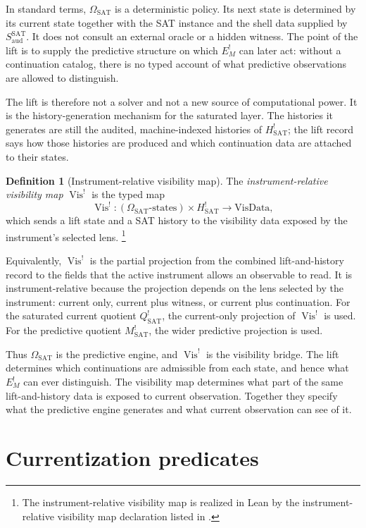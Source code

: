 \documentclass[11pt]{article}
\newcommand{\Saud}{S_{\mathrm{aud}}^{\mathrm{SAT}}}
\newcommand{\Hsat}{H^{!}_{\mathrm{SAT}}}
\newcommand{\EMbang}{E^{!}_{M}}
\newcommand{\Qsat}{Q^{!}_{\mathrm{SAT}}}
\newcommand{\Msat}{M^{!}_{\mathrm{SAT}}}
\newcommand{\OmegaSAT}{\Omega_{\mathrm{SAT}}}
\newcommand{\VisBang}{\operatorname{Vis}^{!}}
\theoremstyle{definition}
\newtheorem{definition}[theorem]{Definition}
\begin{document}
In standard terms, \(\OmegaSAT\) is a deterministic policy.  Its next
state is determined by its current state together with the SAT
instance and the shell data supplied by \(\Saud\).  It does not
consult an external oracle or a hidden witness.  The point of the lift
is to supply the predictive structure on which \(\EMbang\) can later
act: without a continuation catalog, there is no typed account of what
predictive observations are allowed to distinguish.

The lift is therefore not a solver and not a new source of
computational power.  It is the history-generation mechanism for the
saturated layer.  The histories it generates are still the audited,
machine-indexed histories of \(\Hsat\); the lift record says how those
histories are produced and which continuation data are attached to
their states.

\begin{definition}[Instrument-relative visibility map]
\label{def:pvnp:vis-bang}
The \emph{instrument-relative visibility map} \(\VisBang\) is the
typed map
\[
  \VisBang:
  (\OmegaSAT\text{-states})\times\Hsat
  \longrightarrow \mathrm{VisData},
\]
which sends a lift state and a SAT history to the visibility data
exposed by the instrument's selected lens.
\footnote{The instrument-relative visibility map is realized in Lean by
the instrument-relative visibility map declaration listed in
.}
\end{definition}

Equivalently, \(\VisBang\) is the partial projection from the combined
lift-and-history record to the fields that the active instrument
allows an observable to read.  It is instrument-relative because the
projection depends on the lens selected by the instrument: current
only, current plus witness, or current plus continuation.  For the
saturated current quotient \(\Qsat\), the current-only projection of
\(\VisBang\) is used.  For the predictive quotient \(\Msat\), the
wider predictive projection is used.

Thus \(\OmegaSAT\) is the predictive engine, and \(\VisBang\) is the
visibility bridge.  The lift determines which continuations are
admissible from each state, and hence what \(\EMbang\) can ever
distinguish.  The visibility map determines what part of the same
lift-and-history data is exposed to current observation.  Together
they specify what the predictive engine generates and what current
observation can see of it.
 

\section{Currentization predicates}
\label{sec:currentize}
\end{document}
